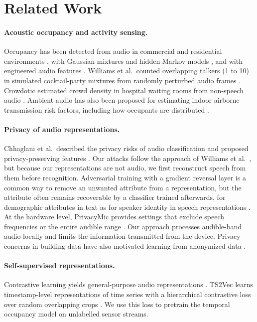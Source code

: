 \documentclass[11pt]{article}
\begin{document}
\section{Related Work}

\paragraph{Acoustic occupancy and activity sensing.} Occupancy has been detected from audio in commercial and residential environments \citep{ghaffarzadegan2017occupancy}, with Gaussian mixtures and hidden Markov models \citep{valle2016abroa}, and with engineered audio features \citep{santiago2021audio}. Williams et al.\ counted overlapping talkers (1 to 10) in simulated cocktail-party mixtures from randomly perturbed audio frames \citep{williams2023privacy}. Crowdotic estimated crowd density in hospital waiting rooms from non-speech audio \citep{alhossain2023crowdotic}. Ambient audio has also been proposed for estimating indoor airborne transmission risk factors, including how occupants are distributed \citep{chhaglani2025ambient}.

\paragraph{Privacy of audio representations.} Chhaglani et al.\ described the privacy risks of audio classification and proposed privacy-preserving features \citep{chhaglani2024privacy}. Our attacks follow the approach of Williams et al.\ \citep{williams2023privacy}, but because our representations are not audio, we first reconstruct speech from them before recognition. Adversarial training with a gradient reversal layer \citep{ganin2015grl} is a common way to remove an unwanted attribute from a representation, but the attribute often remains recoverable by a classifier trained afterwards, for demographic attributes in text \citep{elazar2018adversarial} as for speaker identity in speech representations \citep{srivastava2019privacy}. At the hardware level, PrivacyMic provides settings that exclude speech frequencies or the entire audible range \citep{iravantchi2021privacymic}. Our approach processes audible-band audio locally and limits the information transmitted from the device. Privacy concerns in building data have also motivated learning from anonymized data \citep{choi2026pptl}.

\paragraph{Self-supervised representations.} Contrastive learning yields general-purpose audio representations \citep{saeed2020cola}. TS2Vec learns timestamp-level representations of time series with a hierarchical contrastive loss over random overlapping crops \citep{yue2022ts2vec}. We use this loss to pretrain the temporal occupancy model on unlabelled sensor streams.
\end{document}
